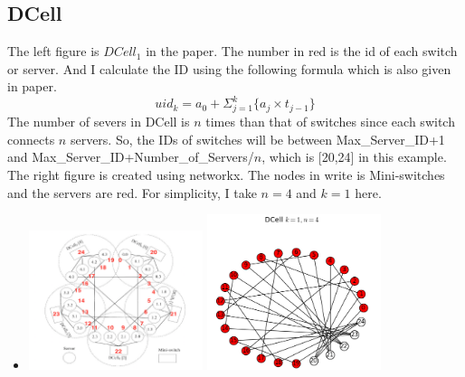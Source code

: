 \documentclass[11pt]{article}
\begin{document}
\subsection{DCell}
The left figure is $DCell_1$ in the paper. The number in red is the id of each switch or server. And I calculate the ID using the following formula which is also given in paper.
\[
uid_k = a_0 + \Sigma_{j=1}^{k}\{a_j \times t_{j-1}\}
\]
The number of severs in DCell is $n$ times than that of switches since each switch connects $n$ servers. So, the IDs of switches will be between Max\_Server\_ID+1 and Max\_Server\_ID+Number\_of\_Servers/$n$, which is [20,24] in this example.\vspace{2ex}\\
The right figure is created using networkx. The nodes in write is Mini-switches and the servers are red. For simplicity, I take $n = 4$ and $k = 1$ here. \vspace{2ex}\\
\begin{itemize}
	
	\item
	\centerline{}
	\includegraphics[width=0.4\textwidth]{figure/draw/DCell_original.png}
	\includegraphics[width=0.4\textwidth]{figure/draw/DCell.png}
	
\end{itemize}
\end{document}
